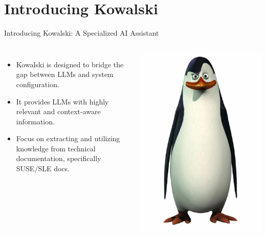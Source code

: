 \documentclass[aspectratio=169]{beamer}
\begin{document}
\section{Introducing Kowalski}
\begin{frame}{Introducing Kowalski: A Specialized AI Assistant}
\begin{columns}
  \begin{itemize}
    \item Kowalski is designed to bridge the gap between LLMs and system configuration.
    \item It provides LLMs with highly relevant and context-aware information.
    \item Focus on extracting and utilizing knowledge from technical documentation, specifically SUSE/SLE docs.
  \end{itemize}
  \includegraphics[width=\linewidth]{Kowalski}
\end{columns}
\end{frame}
\end{document}
